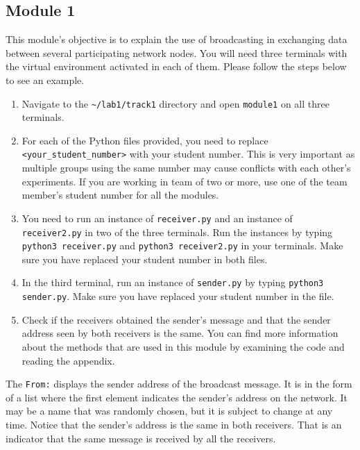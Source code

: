 \documentclass[11pt]{article}
\begin{document}
\subsection{Module 1}
\label{subsec:module1}
This module's objective is to explain the use of broadcasting in exchanging data between several participating network nodes.
You will need three terminals with the virtual environment activated in each of them. Please follow the steps below to see an example.
\begin{enumerate}
    \item Navigate to the \texttt{\textasciitilde/lab1/track1} directory and open \texttt{module1} on all three terminals.
    \item For each of the Python files provided, you need to replace \texttt{<your\_student\_number>} with your student number. This is very important as multiple groups using the same number may cause conflicts with each other's experiments. If you are working in team of two or more, use one of the team member's student number for all the modules.
    \item You need to run an instance of \texttt{receiver.py} and an instance of \texttt{receiver2.py} in two of the three terminals. Run the instances by typing \texttt{python3 receiver.py} and \texttt{python3 receiver2.py} in your terminals. Make sure you have replaced your student number in both files.
    \item In the third terminal, run an instance of \texttt{sender.py} by typing \texttt{python3 sender.py}. Make sure you have replaced your student number in the file.
    \item Check if the receivers obtained the sender's message and that the sender address seen by both receivers is the same. You can find more information about the methods that are used in this module by examining the code and reading the appendix.
\end{enumerate}


The \texttt{From:} displays the sender address of the broadcast message.
It is in the form of a list where the first element indicates the sender's address on the network.
It may be a name that was randomly chosen, but it is subject to change at any time.
Notice that the sender's address is the same in both receivers. That is an indicator that the same message is received by all the receivers.
\end{document}
